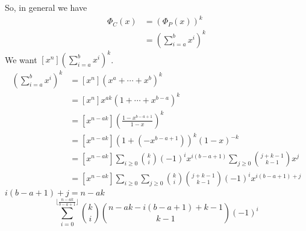 So, in general we have
\begin{align*}
    \Phi_C(x) & =\left(\Phi_P(x)\right)^k                   \\
              & =\left( \sum\limits_{i=a}^{b} x^i \right)^k
\end{align*}
We want $ \left[x^n\right]\left( \sum\limits_{i=a}^{b} x^i \right)^k $.
\begin{align*}
    [x^n]\left( \sum\limits_{i=a}^{b} x^i \right)^k
     & =\left[x^n\right](x^a+\cdots+x^b)^k                                                                              \\
     & =\left[x^n\right]x^{ak}(1+\cdots+x^{b-a})^k                                                                      \\
     & =\left[x^{n-ak}\right]\left(\frac{1-x^{b-a+1}}{1-x}\right)^k                                                     \\
     & =\left[x^{n-ak}\right]\left(1+(-x^{b-a+1})\right)^k(1-x)^{-k}                                                    \\
     & =\left[x^{n-ak}\right]\sum\limits_{i\ge 0}\binom{k}{i}(-1)^ix^{i(b-a+1)}
    \sum\limits_{j\ge 0}\binom{j+k-1}{k-1}x^{j}                                                                         \\
     & =\left[x^{n-ak}\right]\sum\limits_{i\ge 0}\sum\limits_{j\ge 0}\binom{k}{i}\binom{j+k-1}{k-1}(-1)^ix^{i(b-a+1)+j}
\end{align*}
$ i(b-a+1)+j=n-ak $
\[ \sum\limits_{i=0}^{\lfloor \frac{n-ak}{b-a+1} \rfloor}
    \binom{k}{i}\binom{n-ak-i(b-a+1)+k-1}{k-1}(-1)^i \]
